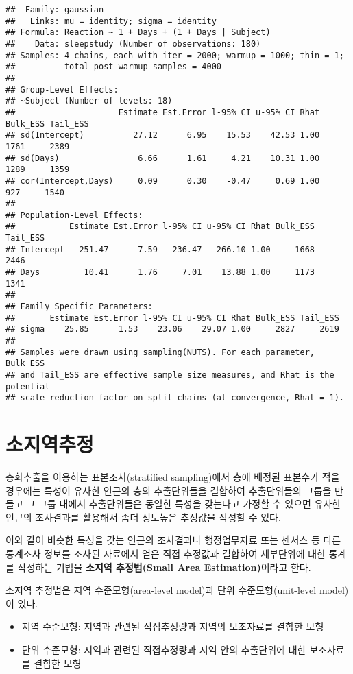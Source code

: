 \documentclass[
]{book}
\providecommand{\tightlist}{%
  \setlength{\itemsep}{0pt}\setlength{\parskip}{0pt}}
\begin{document}
\begin{verbatim}
##  Family: gaussian 
##   Links: mu = identity; sigma = identity 
## Formula: Reaction ~ 1 + Days + (1 + Days | Subject) 
##    Data: sleepstudy (Number of observations: 180) 
## Samples: 4 chains, each with iter = 2000; warmup = 1000; thin = 1;
##          total post-warmup samples = 4000
## 
## Group-Level Effects: 
## ~Subject (Number of levels: 18) 
##                     Estimate Est.Error l-95% CI u-95% CI Rhat Bulk_ESS Tail_ESS
## sd(Intercept)          27.12      6.95    15.53    42.53 1.00     1761     2389
## sd(Days)                6.66      1.61     4.21    10.31 1.00     1289     1359
## cor(Intercept,Days)     0.09      0.30    -0.47     0.69 1.00      927     1540
## 
## Population-Level Effects: 
##           Estimate Est.Error l-95% CI u-95% CI Rhat Bulk_ESS Tail_ESS
## Intercept   251.47      7.59   236.47   266.10 1.00     1668     2446
## Days         10.41      1.76     7.01    13.88 1.00     1173     1341
## 
## Family Specific Parameters: 
##       Estimate Est.Error l-95% CI u-95% CI Rhat Bulk_ESS Tail_ESS
## sigma    25.85      1.53    23.06    29.07 1.00     2827     2619
## 
## Samples were drawn using sampling(NUTS). For each parameter, Bulk_ESS
## and Tail_ESS are effective sample size measures, and Rhat is the potential
## scale reduction factor on split chains (at convergence, Rhat = 1).
\end{verbatim}

\hypertarget{sae}{%
\chapter{소지역추정}\label{sae}}

층화추출을 이용하는 표본조사(stratified sampling)에서 층에 배정된 표본수가 적을 경우에는 특성이 유사한 인근의 층의 추출단위들을 결합하여 추출단위들의 그룹을 만들고 그 그룹 내에서 추출단위들은 동일한 특성을 갖는다고 가정할 수 있으면 유사한 인근의 조사결과를 활용해서 좀더 정도높은 추정값을 작성할 수 있다.

이와 같이 비슷한 특성을 갖는 인근의 조사결과나 행정업무자료 또는 센서스 등 다른 통계조사 정보를 조사된 자료에서 얻은 직접 추정값과 결합하여 세부단위에 대한 통계를 작성하는 기법을 \textbf{소지역 추정법(Small Area Estimation)}이라고 한다.

소지역 추정법은 지역 수준모형(area-level model)과 단위 수준모형(unit-level model)이 있다.

\begin{itemize}
\tightlist
\item
  지역 수준모형: 지역과 관련된 직접추정량과 지역의 보조자료를 결합한 모형
\item
  단위 수준모형: 지역과 관련된 직접추정량과 지역 안의 추출단위에 대한 보조자료를 결합한 모형
\end{itemize}
\end{document}
